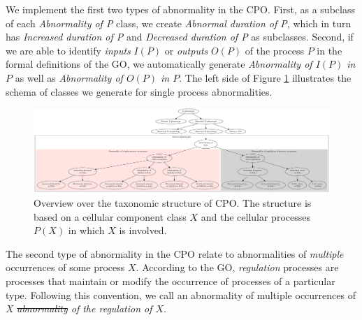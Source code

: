 \documentclass{bioinfo}
\providecommand{\DIFadd}[1]{{\protect\color{blue}\uwave{#1}}} %
\providecommand{\DIFdel}[1]{{\protect\color{red}\sout{#1}}}                      %
\providecommand{\DIFaddbegin}{} %
\providecommand{\DIFaddend}{} %
\providecommand{\DIFdelbegin}{} %
\providecommand{\DIFdelend}{} %
\begin{document}
We implement the first two types of abnormality in the CPO. First, as
a subclass of each {\em Abnormality of P} class, we create {\em
  Abnormal duration of P}, which in turn has {\em Increased duration
  of P} and {\em Decreased duration of P} as subclasses. Second, if we
are able to identify {\em inputs} $I(P)$ or {\em outputs} $O(P)$ of
the process $P$ in the formal definitions of the GO, we automatically
generate {\em Abnormality of $I(P)$ in $P$} as well as {\em
  Abnormality of $O(P)$ in $P$}.  The left side of Figure
\ref{fig:overview} illustrates the schema of classes we generate for
single process abnormalities.
\begin{figure}
  \centering
  \includegraphics[width=1\textwidth]{overview.eps}
  \caption{Overview over the taxonomic structure of CPO. The structure
    is based on a cellular component class $X$ and the cellular
    processes $P(X)$ in which $X$ is involved.\label{fig:overview}}
\end{figure}

The second type of abnormality in the CPO relate to abnormalities of
{\em multiple} occurrences of some process $X$. According to the GO,
{\em regulation} processes are processes that maintain or modify the
occurrence of processes of a particular type. Following this
convention, we call an abnormality of multiple occurrences of $X$ {\em
  \DIFdelbegin \DIFdel{abnormality }\DIFdelend \DIFaddbegin \DIFadd{Abnormality }\DIFaddend of the regulation of $X$}.
\end{document}
